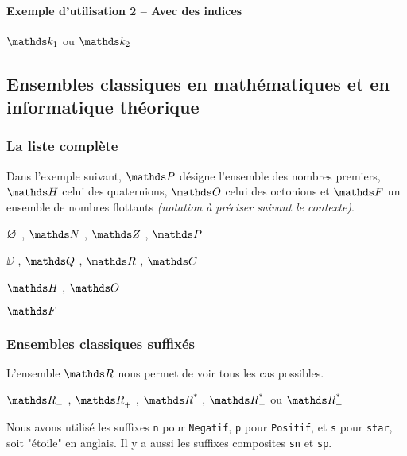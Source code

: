 \documentclass[12pt,a4paper]{article}
\theoremstyle{definition}
\begin{document}


\paragraph{Exemple d'utilisation 2 -- Avec des indices}

\begin{latexex}
$\setalge*{k}{1}$ ou $\setalge*{k}{2}$
\end{latexex}




\subsection{Ensembles classiques en mathématiques et en informatique théorique} 

\subsubsection{La liste complète}

Dans l'exemple suivant,
$\PP$ désigne l'ensemble des nombres premiers,
$\HH$ celui des quaternions,
$\OO$ celui des octonions et
$\FF$ un ensemble de nombres flottants \emph{(notation à préciser suivant le contexte)}.

\begin{latexex}
$\nullset$ , $\NN$ , $\ZZ$ , $\PP$

$\DD$ , $\QQ$ , $\RR$ , $\CC$

$\HH$ , $\OO$

$\FF$
\end{latexex}




\subsubsection{Ensembles classiques suffixés}

L'ensemble $\RR$ nous permet de voir tous les cas possibles. 

\begin{latexex}
$\RRn$ ,
$\RRp$ ,
$\RRs$ ,
$\RRsn$ ou
$\RRsp$
\end{latexex}


Nous avons utilisé les suffixes \verb+n+ pour \verb+Negatif+, \verb+p+ pour \verb+Positif+, et \verb+s+ pour \verb+star+, soit "étoile" en anglais. Il y a aussi les suffixes composites \verb+sn+ et \verb+sp+.

\medskip
\end{document}
